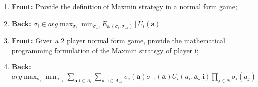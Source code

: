 \documentclass{article}
\begin{document}
\begin{enumerate}
    \item \textbf{Front:} Provide the definition of Maxmin strategy in a normal form game;\newpage
    \item \textbf{Back:} $\sigma_i \in arg \max_{\sigma_i} \min_{\sigma_{-i}} E_{\textbf{a}~(\sigma_i, \sigma_{-i})}[U_i(\textbf{a})]$\newpage
    \item \textbf{Front:} Given a 2 player normal form game, provide the mathematical programming formulation of the Maxmin strategy of player i;\newpage
    \item \textbf{Back:} $arg \max_{\sigma_i} \min_{\sigma_{-i}} \sum_{\textbf{a_i} \in A_i} \sum_{\textbf{a_{-i}} \in A_{-i}} \sigma_i(\textbf{a}) \sigma_{-i}(\textbf{a}) U_i(a_i, \textbf{a_{-i}}) \prod_{j \in N} \sigma_i(a_j)$\newpage
\end{enumerate}
\end{document}
